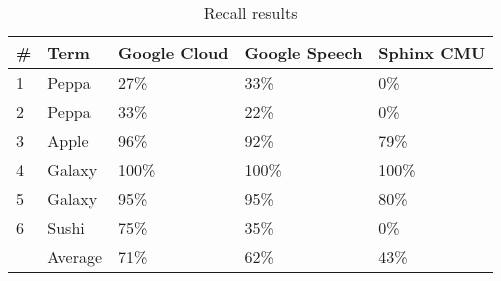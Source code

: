 \begin{table}[ht]
    \centering
    \caption{Recall results}
    \label{tab:Accents}
    \begin{tabular}{l|l|l|l|l}
    \textbf{\#} & \textbf{Term}   & \textbf{Google} \textbf{Cloud} &\textbf{} \textbf{Google} \textbf{Speech} & \textbf{Sphinx} \textbf{CMU} \\ \hline
    1        & Peppa  & 27\%             & 33\%              & 0\%        \\
    2        & Peppa  & 33\%             & 22\%              & 0\%        \\
    3        & Apple  & 96\%             & 92\%              & 79\%       \\
    4        & Galaxy & 100\%            & 100\%             & 100\%      \\
    5        & Galaxy & 95\%             & 95\%              & 80\%       \\
    6        & Sushi  & 75\%             & 35\%              & 0\%        \\ \hline
    ~       & Average & 71\%    & 62\%  &   43\%    \\
    \end{tabular}
\end{table}